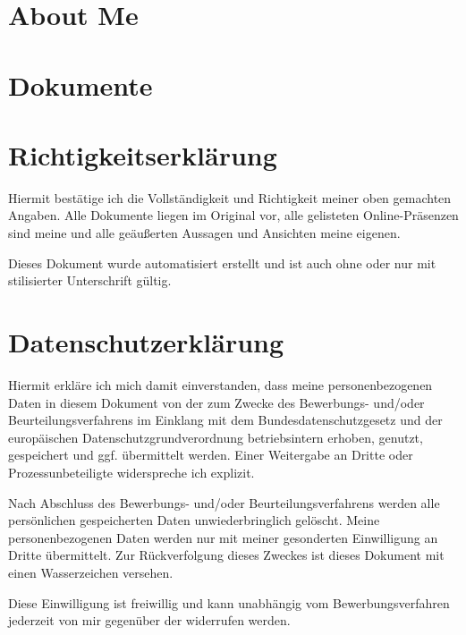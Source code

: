 \documentclass[
	a4paper,
	fontsize=12
]{scrartcl}
\begin{document}
\endgroup %

\section{About Me}
\RecpSalutation
\bigskip

\CVAboutMe
\newpage


\section{Dokumente}

\newcommand{\RemainingPageHeight}{\dimexpr\pagegoal-\pagetotal-\baselineskip\relax}

\newcommand{\PageFillImage}[1]{%
	\begin{minipage}[b]{\textwidth}
		\center\fcolorbox{RoyalBlue}{white}{
			\texttt{[image: \\CVDataPath/\#1]}
		}
	\end{minipage}
	\newpage
}%

\CVDocs

\section{Richtigkeitserklärung}
Hiermit bestätige ich die Vollständigkeit und Richtigkeit meiner oben gemachten
Angaben. Alle Dokumente liegen im Original vor, alle gelisteten Online-Präsenzen
sind meine und alle geäußerten Aussagen und Ansichten meine eigenen.

Dieses Dokument wurde automatisiert erstellt und ist auch ohne oder nur mit
stilisierter Unterschrift gültig.

\section{Datenschutzerklärung}
Hiermit erkläre ich mich damit einverstanden, dass meine personenbezogenen Daten
in diesem Dokument von der \RecpCompany{} zum Zwecke des Bewerbungs- und/oder
Beurteilungsverfahrens im Einklang mit dem Bundesdatenschutzgesetz und der
europäischen Datenschutzgrundverordnung betriebsintern erhoben, genutzt,
gespeichert und ggf. übermittelt werden.
Einer Weitergabe an Dritte oder Prozessunbeteiligte widerspreche ich explizit.

Nach Abschluss des Bewerbungs- und/oder Beurteilungsverfahrens werden alle
persönlichen gespeicherten Daten unwiederbringlich gelöscht.
Meine personenbezogenen Daten werden nur mit meiner gesonderten Einwilligung
an Dritte übermittelt. Zur Rückverfolgung dieses Zweckes ist dieses Dokument
mit einen Wasserzeichen versehen.

Diese Einwilligung ist freiwillig und kann unabhängig vom Bewerbungsverfahren
jederzeit von mir gegenüber der \RecpCompany{} widerrufen werden.
\vfill
\MySignature
\vfill\vfill\vfill
\end{document}
